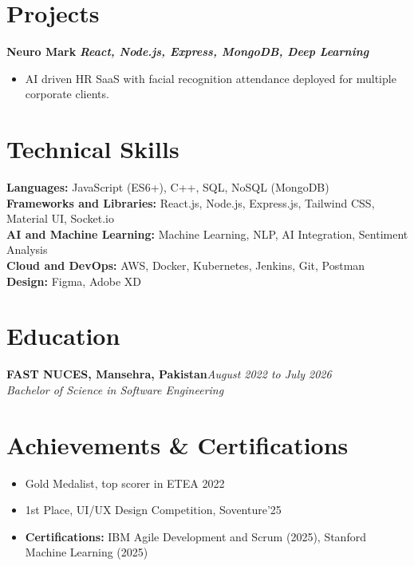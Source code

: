 \documentclass[11pt,letterpaper]{article}
\begin{document}
\section{Projects}
\textbf{Neuro Mark} \textbar{} \textbf{\textit{React, Node.js, Express, MongoDB, Deep Learning}}
\begin{itemize}
  \item AI driven HR SaaS with facial recognition attendance deployed for multiple corporate clients.
\end{itemize}



\section{Technical Skills}
\textbf{Languages:} JavaScript (ES6+), C++, SQL, NoSQL (MongoDB)\\[0.1em]
\textbf{Frameworks and Libraries:} React.js, Node.js, Express.js, Tailwind CSS, Material UI, Socket.io\\[0.1em]
\textbf{AI and Machine Learning:} Machine Learning, NLP, AI Integration, Sentiment Analysis\\[0.1em]
\textbf{Cloud and DevOps:} AWS, Docker, Kubernetes, Jenkins, Git, Postman\\[0.1em]
\textbf{Design:} Figma, Adobe XD



\section{Education}
\textbf{FAST NUCES, Mansehra, Pakistan}\hfill\textit{August 2022 to July 2026}\\
\textit{Bachelor of Science in Software Engineering}



\section{Achievements \& Certifications}
\begin{itemize}
  \item Gold Medalist, top scorer in ETEA 2022
  \item 1st Place, UI/UX Design Competition, Soventure'25
  \item \textbf{Certifications:} IBM Agile Development and Scrum (2025), Stanford Machine Learning (2025)
\end{itemize}
\end{document}
